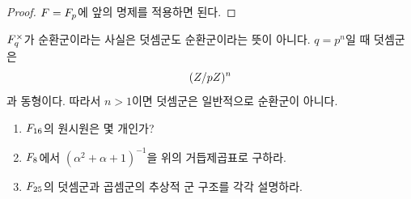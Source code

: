 \begin{proof}
$F=F_p$에 앞의 명제를 적용하면 된다.
\end{proof}

\begin{pitfall}
$F_q^\times$가 순환군이라는 사실은 덧셈군도 순환군이라는 뜻이 아니다. $q=p^n$일 때 덧셈군은
\[
  (Z/pZ)^n
\]
과 동형이다. 따라서 $n>1$이면 덧셈군은 일반적으로 순환군이 아니다.
\end{pitfall}

\begin{checkpoint}
\begin{enumerate}[label=(\alph*)]
  \item $F_{16}$의 원시원은 몇 개인가?
  \item $F_8$에서 $(\alpha^2+\alpha+1)^{-1}$을 위의 거듭제곱표로 구하라.
  \item $F_{25}$의 덧셈군과 곱셈군의 추상적 군 구조를 각각 설명하라.
\end{enumerate}
\end{checkpoint}
